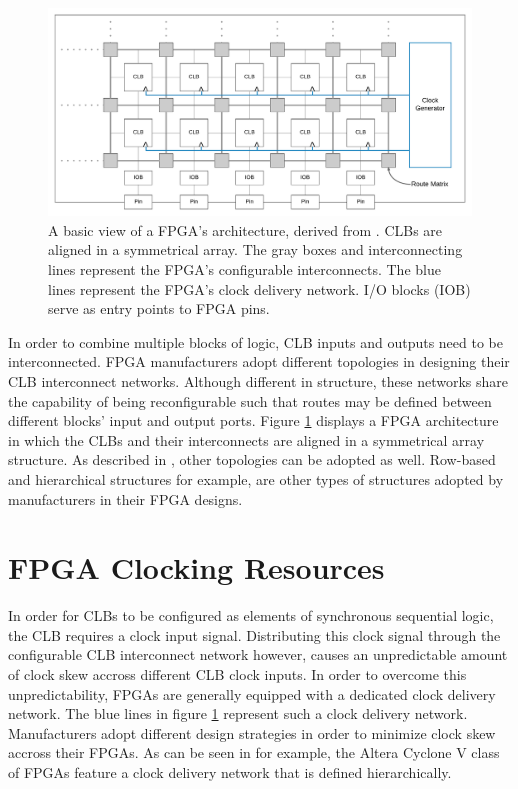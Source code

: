 \documentclass[main.tex]{subfiles}
\begin{document}
\begin{figure}[h]
    \centering
    \caption{A basic view of a FPGA's architecture, derived from \cite[Fig.2]{szedoAboutFpgas}. CLBs are aligned in a symmetrical array. The gray boxes and interconnecting lines represent the FPGA's configurable interconnects. The blue lines represent the FPGA's clock delivery network. I/O blocks (IOB) serve as entry points to FPGA pins.}
    \label{fig:fpga-architecture}
    \includegraphics[width=\textwidth]{img/fpga-architecture}
\end{figure}

In order to combine multiple blocks of logic, CLB inputs and outputs need to be interconnected. FPGA manufacturers adopt different topologies in designing their CLB interconnect networks. Although different in structure, these networks share the capability of being reconfigurable such that routes may be defined between different blocks' input and output ports. Figure \ref{fig:fpga-architecture} displays a FPGA architecture in which the CLBs and their interconnects are aligned in a symmetrical array structure. As described in \cite[Fig.2]{szedoAboutFpgas}, other topologies can be adopted as well. Row-based and hierarchical structures for example, are other types of structures adopted by manufacturers in their FPGA designs.  

\section{FPGA Clocking Resources}
\label{section-fpga-clocking-resources}
In order for CLBs to be configured as elements of synchronous sequential logic, the CLB requires a clock input signal. Distributing this clock signal through the configurable CLB interconnect network however, causes an unpredictable amount of clock skew accross different CLB clock inputs. In order to overcome this unpredictability, FPGAs are generally equipped with a dedicated clock delivery network. The blue lines in figure \ref{fig:fpga-architecture} represent such a clock delivery network. Manufacturers adopt different design strategies in order to minimize clock skew accross their FPGAs. As can be seen in \cite{cv5v2} for example, the Altera Cyclone V class of FPGAs feature a clock delivery network that is defined hierarchically. 
\end{document}
